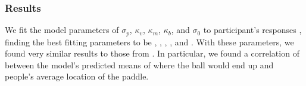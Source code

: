 \documentclass[10pt,letterpaper]{article}
\begin{document}
\subsubsection{Results}

We fit the model parameters of $\sigma_p$, $\kappa_v$, $\kappa_m$, $\kappa_b$, and $\sigma_0$ to participant's responses \cite<for details, see>{Smith:2013fc}, finding the best fitting parameters to be \perr{}, \kapv{}, \kapm{}, \kapb{}, and \sdzero{}. 
With these parameters, we found very similar results to those from .
In particular, we found a correlation of \PaddleCorr{} between the model's predicted means of where the ball would end up and people's average location of the paddle.



\setlength{\bibleftmargin}{.125in}
\setlength{\bibindent}{-\bibleftmargin}


\end{document}
